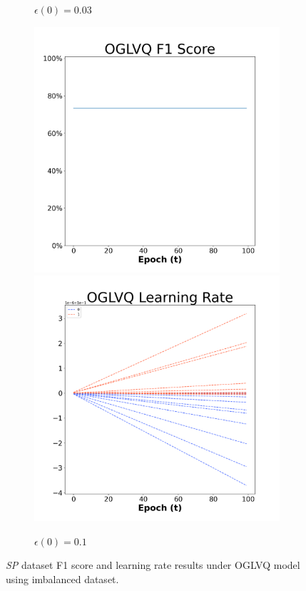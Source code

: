 \begin{figure}[H]
\begin{subfigure}{0.3\textwidth}
  \caption{$\epsilon(0)=0.03$}
\end{subfigure}\hfil %
\begin{subfigure}{0.3\textwidth}
  \includegraphics[width=\linewidth]{images/exper2/SP/OGLVQ_0.1_f1.png}
  \includegraphics[width=\linewidth]{images/exper2/SP/OGLVQ_0.1_lr.png}
  \caption{$\epsilon(0)=0.1$}
\end{subfigure}

\caption{\textit{SP} dataset F1 score and learning rate results under OGLVQ model using imbalanced dataset.}
\end{figure}



